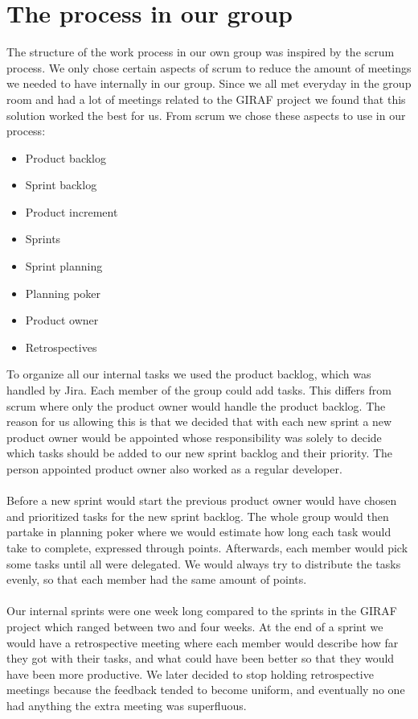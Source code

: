 \section{The process in our group}

The structure of the work process in our own group was inspired by the scrum process.
We only chose certain aspects of scrum to reduce the amount of meetings we needed to have internally in our group. 
Since we all met everyday in the group room and had a lot of meetings related to the GIRAF project we found that this solution worked the best for us.
From scrum we chose these aspects to use in our process:

 \begin{itemize}
    \item Product backlog
    \item Sprint backlog
    \item Product increment
    \item Sprints
    \item Sprint planning
    \item Planning poker
    \item Product owner
    \item Retrospectives
 \end{itemize}
To organize all our internal tasks we used the product backlog, which was handled by Jira.
Each member of the group could add tasks.
This differs from scrum where only the product owner would handle the product backlog.
The reason for us allowing this is that we decided that with each new sprint a new product owner would be appointed whose responsibility was solely to decide which tasks should be added to our new sprint backlog and their priority.
The person appointed product owner also worked as a regular developer.
\\\\
Before a new sprint would start the previous product owner would have chosen and prioritized tasks for the new sprint backlog.
The whole group would then partake in planning poker where we would estimate how long each task would take to complete, expressed through points.
Afterwards, each member would pick some tasks until all were delegated.
We would always try to distribute the tasks evenly, so that each member had the same amount of points.
\\\\
Our internal sprints were one week long compared to the sprints in the GIRAF project which ranged between two and four weeks.
At the end of a sprint we would have a retrospective meeting where each member would describe how far they got with their tasks, and what could have been better so that they would have been more productive.
We later decided to stop holding retrospective meetings because the feedback tended to become uniform, and eventually no one had anything the extra meeting was superfluous.


